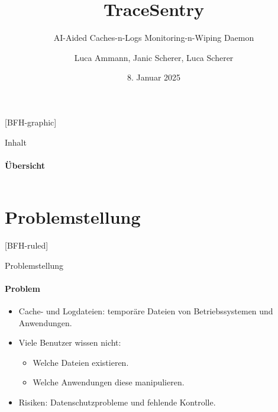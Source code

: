 \documentclass[
    ngerman,%
    authorontitle=true,
]{bfhbeamer}
\title{TraceSentry}
\subtitle{AI-Aided Caches-n-Logs Monitoring-n-Wiping Daemon}
\author[L. Ammann, J. Scherer, L. Scherer]{Luca Ammann, Janic Scherer, Luca Scherer}
\date{8. Januar 2025}
\institute{BFH-TI}
\begin{document}
    [BFH-graphic]
    \maketitle

    \begin{frame}{Inhalt}
        \framesubtitle{Übersicht}
        \begin{columns}
            \begin{column}{0.4\textwidth}
                \tableofcontents
            \end{column}
            \begin{column}{0.6\textwidth}
                \begin{center}
                \end{center}
            \end{column}
        \end{columns}
    \end{frame}


    \section{Problemstellung}\label{sec:problemstellung}
    [BFH-ruled]
    \frame{\sectionpage}

    \begin{frame}{Problemstellung}
        \framesubtitle{Problem}
        \begin{itemize}
            \item Cache- und Logdateien: tempor\"are Dateien von Betriebssystemen und Anwendungen.
            \item Viele Benutzer wissen nicht:
            \begin{itemize}
                \item Welche Dateien existieren.
                \item Welche Anwendungen diese manipulieren.
            \end{itemize}
            \item Risiken: Datenschutzprobleme und fehlende Kontrolle.
        \end{itemize}
    \end{frame}
\end{document}
